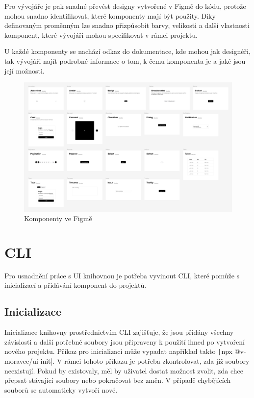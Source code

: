 Pro vývojáře je pak snadné převést designy vytvořené v Figmě do kódu, protože mohou snadno identifikovat, které komponenty mají být použity. Díky definovaným proměnným lze snadno přizpůsobit barvy, velikosti a další vlastnosti komponent, které vývojáři mohou specifikovat v rámci projektu.

U každé komponenty se nachází odkaz do dokumentace, kde mohou jak designéři, tak vývojáři najít podrobné informace o tom, k čemu komponenta je a jaké jsou její možnosti.

\begin{figure}[H]
  \includegraphics[width=\textwidth]{images/figma-kit}
  \caption{Komponenty ve Figmě} \label{picture:figma-kit}
\end{figure}

\section{CLI}
Pro usnadnění práce s UI knihovnou je potřeba vyvinout CLI, které pomůže s inicializací a přidávání komponent do projektů.

\subsection{Inicializace}
Inicializace knihovny prostřednictvím CLI zajišťuje, že jsou přidány všechny závislosti a další potřebné soubory jsou připraveny k použití ihned po vytvoření nového projektu. Příkaz pro inicializaci může vypadat například takto \texttt|npx @v-moravec/ui init|. V rámci tohoto příkazu je potřeba zkontrolovat, zda již soubory neexistují. Pokud by existovaly, měl by uživatel dostat možnost zvolit, zda chce přepsat stávající soubory nebo pokračovat bez změn. V případě chybějících souborů se automaticky vytvoří nové.

